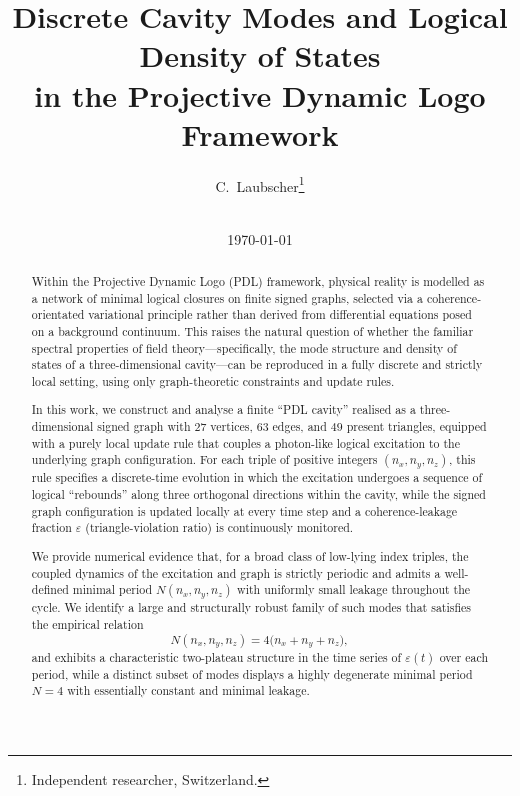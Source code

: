 \documentclass{article}
\theoremstyle{definition}
\begin{document}
\title{Discrete Cavity Modes and Logical Density of States\\[4pt]
in the Projective Dynamic Logo Framework}

\author{C.~Laubscher\thanks{Independent researcher, Switzerland.}\\\\[4pt]}

\date{\small \today}

\maketitle

\begin{abstract}
Within the Projective Dynamic Logo (PDL) framework, physical reality is modelled as a network of minimal logical closures on finite signed graphs, selected via a coherence-orientated variational principle rather than derived from differential equations posed on a background continuum.\cite{PDL_Intro_2026,PDL_Main_2026} This raises the natural question of whether the familiar spectral properties of field theory—specifically, the mode structure and density of states of a three-dimensional cavity—can be reproduced in a fully discrete and strictly local setting, using only graph-theoretic constraints and update rules.\cite{Effective_Fields_PDL_2026,PDL_Global_Mapping_2026}

In this work, we construct and analyse a finite ``PDL cavity'' realised as a three-dimensional signed graph with $27$ vertices, $63$ edges, and $49$ present triangles, equipped with a purely local update rule that couples a photon-like logical excitation to the underlying graph configuration.\cite{Effective_Fields_PDL_2026} For each triple of positive integers $(n_x,n_y,n_z)$, this rule specifies a discrete-time evolution in which the excitation undergoes a sequence of logical ``rebounds'' along three orthogonal directions within the cavity, while the signed graph configuration is updated locally at every time step and a coherence-leakage fraction $\varepsilon$ (triangle-violation ratio) is continuously monitored.\cite{Effective_Fields_PDL_2026,Exponent_18_PDL_2026}

We provide numerical evidence that, for a broad class of low-lying index triples, the coupled dynamics of the excitation and graph is strictly periodic and admits a well-defined minimal period $N(n_x,n_y,n_z)$ with uniformly small leakage throughout the cycle.\cite{Exponent_18_PDL_2026,Topological_Reformulation_PDL_2026} We identify a large and structurally robust family of such modes that satisfies the empirical relation
\[
N(n_x,n_y,n_z) = 4 \bigl(n_x + n_y + n_z\bigr),
\]
and exhibits a characteristic two-plateau structure in the time series of $\varepsilon(t)$ over each period, while a distinct subset of modes displays a highly degenerate minimal period $N = 4$ with essentially constant and minimal leakage.\cite{Effective_Fields_PDL_2026}


\end{abstract}
\end{document}
